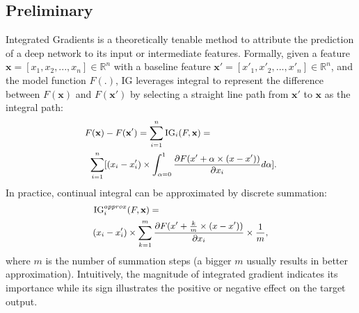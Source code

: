 \documentclass[11pt]{article}
\begin{document}
\subsection{Preliminary} \label{sec:background}
Integrated Gradients \citep{sundararajan2017axiomatic} is a theoretically tenable method to attribute the prediction of a deep network to its input or intermediate features. Formally, given a feature $\mathbf{x} = [x_1, x_2, ..., x_n] \in \mathbb{R}^n$ with a baseline feature $\mathbf{x}' = [x'_1, x'_2, ..., x'_n] \in \mathbb{R}^n$, and the model function $F(.)$, IG leverages integral to represent the difference between $F(\mathbf{x})$ and $F(\mathbf{x}')$ by selecting a straight line path from $\mathbf{x}'$ to $\mathbf{x}$ as the integral path: 
\begin{equation}
\small
\begin{aligned}
	F(\mathbf{x})&-F(\mathbf{x}') = \sum_{i=1}^{n} \text{IG}_i (F,\mathbf{x}) =  \\
 \sum_{i=1}^{n}&[(x_i-x'_i)\times \int_{\alpha=0}^1 \frac{\partial F(x'+\alpha \times (x-x'))}{\partial x_i} d\alpha].
\end{aligned}
\end{equation}
In practice, continual integral can be approximated by discrete summation:
\begin{equation}
\small
\begin{aligned}
    \text{IG}_i^{approx}&(F,\mathbf{x}) = \\
    (x_i-x'_i)&\times \sum_{k=1}^m \frac{\partial F(x'+\frac{k}{m} \times (x-x'))}{\partial x_i} \times \frac{1}{m},
\end{aligned}
\end{equation}
where $m$ is the number of summation steps (a bigger $m$ usually results in better approximation). Intuitively, the magnitude of integrated gradient indicates its importance while its sign illustrates the positive or negative effect on the target output.
\end{document}
